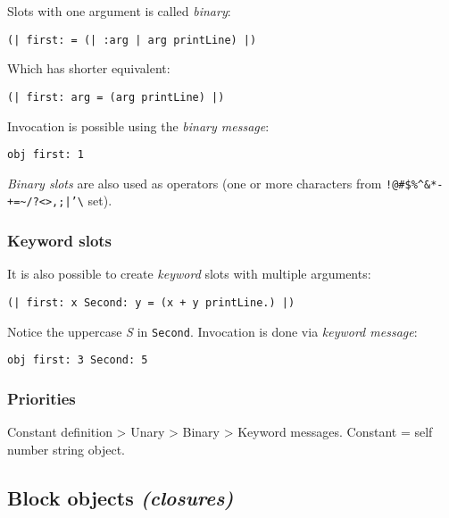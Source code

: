 \documentclass[10pt]{article}
\begin{document}
\begin{multicols*}{3}
Slots with one argument is called \textit{binary}:

\begin{lstlisting}
(| first: = (| :arg | arg printLine) |)
\end{lstlisting}

Which has shorter equivalent:

\begin{lstlisting}
(| first: arg = (arg printLine) |)
\end{lstlisting}

Invocation is possible using the \textit{binary message}:

\begin{lstlisting}
obj first: 1
\end{lstlisting}

\textit{Binary slots} are also used as operators (one or more characters from \texttt{!@\#\$\%\^{}\&*-+=\textasciitilde/?\textless\textgreater,;|'\textbackslash{}} set).



\subsubsection{Keyword slots}

It is also possible to create \textit{keyword} slots with multiple arguments:

\begin{lstlisting}
(| first: x Second: y = (x + y printLine.) |)
\end{lstlisting}

Notice the uppercase \textit{S} in \texttt{Second}. Invocation is done via \textit{keyword message}:

\begin{lstlisting}
obj first: 3 Second: 5
\end{lstlisting}



\subsubsection{Priorities}

Constant definition \textgreater{} Unary \textgreater{} Binary \textgreater{} Keyword messages. Constant = self \textbar{} number \textbar{} string \textbar{} object.




\subsection{Block objects \textit{(closures)}}


\end{multicols*}
\end{document}
